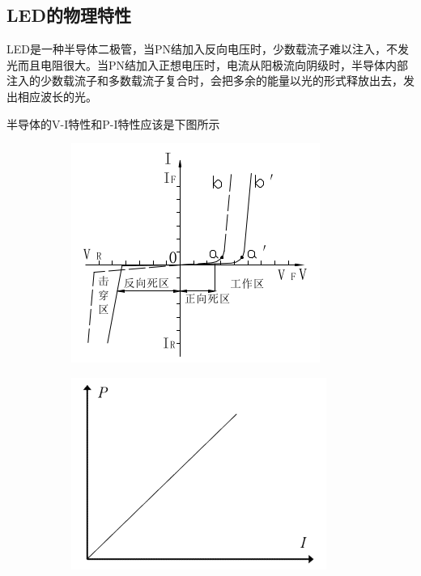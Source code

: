 \documentclass{article}
\begin{document}
\subsection{LED的物理特性}

LED是一种半导体二极管，当PN结加入反向电压时，少数载流子难以注入，不发光而且电阻很大。当PN结加入正想电压时，电流从阳极流向阴级时，半导体内部注入的少数载流子和多数载流子复合时，会把多余的能量以光的形式释放出去，发出相应波长的光。

半导体的V-I特性和P-I特性应该是下图所示

\begin{figure}[H]
  \centering
  \begin{subfigure}{.45\textwidth}
    \centering
    \includegraphics[width=\linewidth]{figures/LED的V-I特性}
  \end{subfigure}
  \begin{subfigure}{.45\textwidth}
    \centering
    \includegraphics[width=\linewidth]{figures/LED的P-I特性}
  \end{subfigure}
\end{figure}
\end{document}

